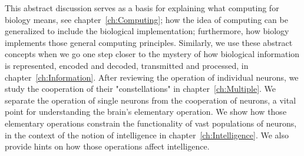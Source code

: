 This abstract discussion serves as a basis for explaining what %
{computing for biology}
means, see chapter~\ref{ch:Computing}; how the idea of computing can be generalized
to include the biological implementation; furthermore, how biology implements
those general computing principles. Similarly, we use these abstract concepts
when we go one step closer to the mystery of how biological information is
represented, encoded and decoded, transmitted and processed,
in chapter~\ref{ch:Information}. After reviewing the operation of individual neurons, we study the cooperation of their "constellations" in chapter~\ref{ch:Multiple}.
We separate the operation of single neurons from the cooperation of neurons, a vital point for understanding the brain's elementary operation.
We show how those elementary operations constrain the functionality of vast populations of neurons, in the context of the notion of intelligence in chapter~\ref{ch:Intelligence}. 
We also provide hints on how those operations affect intelligence.

